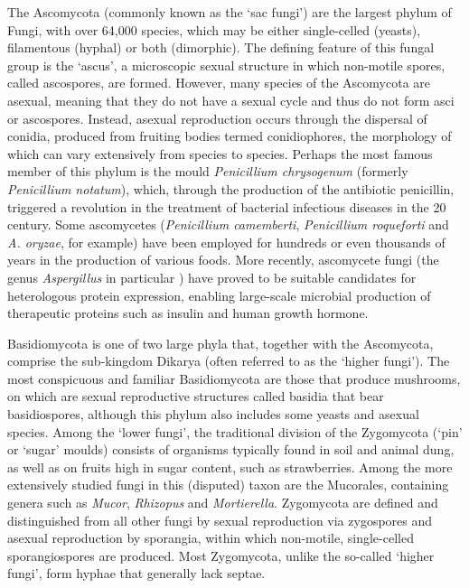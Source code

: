 The Ascomycota (commonly known as the \lq sac fungi') are the largest phylum of Fungi, with over 64,000 species, which may be either single-celled (yeasts), filamentous (hyphal) or both (dimorphic). The defining feature of this fungal group is the \lq ascus', a microscopic sexual structure in which non-motile spores, called ascospores, are formed. However, many species of the Ascomycota are asexual, meaning that they do not have a sexual cycle and thus do not form asci or ascospores. Instead, asexual reproduction occurs through the dispersal of conidia, produced from fruiting bodies termed conidiophores, the morphology of which can vary extensively from species to species. Perhaps the most famous member of this phylum is the mould \emph{Penicillium chrysogenum} (formerly \emph{Penicillium notatum}), which, through the production of the antibiotic penicillin, triggered a revolution in the treatment of bacterial infectious diseases in the 20 century. Some ascomycetes (\emph{Penicillium camemberti}, \emph{Penicillium roqueforti} and \emph{A. oryzae}, for example) have been employed for hundreds or even thousands of years in the production of various foods. More recently, ascomycete fungi (the genus \emph{Aspergillus} in particular \cite{wang2005}) have proved to be suitable candidates for heterologous protein expression, enabling large-scale microbial production of therapeutic proteins such as insulin and human growth hormone.

Basidiomycota is one of two large phyla that, together with the Ascomycota, comprise the sub-kingdom Dikarya (often referred to as the \lq higher fungi'). The most conspicuous and familiar Basidiomycota are those that produce mushrooms, on which are sexual reproductive structures called basidia that bear basidiospores, although this phylum also includes some yeasts and asexual species. Among the \lq lower fungi', the traditional division of the Zygomycota (\lq pin' or \lq sugar' moulds) consists of organisms typically found in soil and animal dung, as well as on fruits high in sugar content, such as strawberries. Among the more extensively studied fungi in this (disputed) taxon are the Mucorales, containing genera such as \emph{Mucor}, \emph{Rhizopus} and \emph{Mortierella}. Zygomycota are defined and distinguished from all other fungi by sexual reproduction via zygospores and asexual reproduction by sporangia, within which non-motile, single-celled sporangiospores are produced. Most Zygomycota, unlike the so-called \lq higher fungi', form hyphae that generally lack septae.